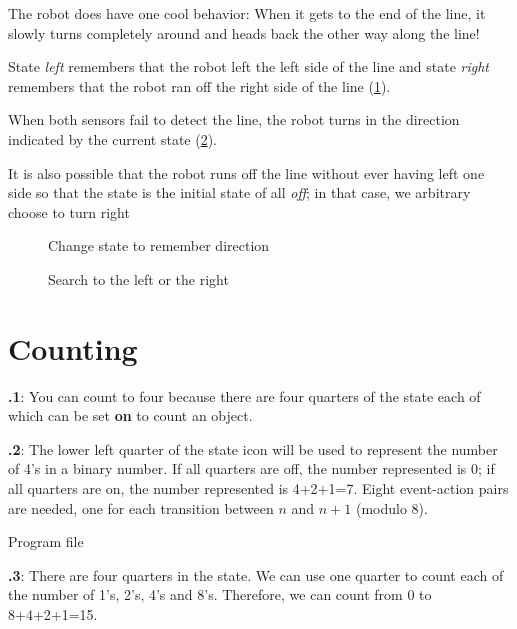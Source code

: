 \documentclass[12pt,a4paper,english]{article}
\begin{document}
The robot does have one cool behavior: When it gets to the end of the
line, it slowly turns completely around and heads back the other way
along the line!

State \emph{left}  remembers that the robot left the
left side of the line and state \emph{right} 
remembers that the robot ran off the right side of the line
(\cref{fig.follow3}).

When both sensors fail to detect the line, the robot turns in the
direction indicated by the current state (\cref{fig.follow1}).

It is also possible that the robot runs off the line without ever having
left one side so that the state is the initial state of all \emph{off};
in that case, we arbitrary choose to turn right 

\begin{figure}
\begin{center}
\caption{Change state to remember direction}\label{fig.follow3}
\end{center}
\end{figure}

\begin{figure}
\begin{center}
\caption{Search to the left or the right}\label{fig.follow1}
\end{center}
\end{figure}

\clearpage

\section{Counting}

\textbf{\thesection.1}:
You can count to four because there are four quarters of the state
each of which can be set \textbf{on} to count an object.

\textbf{\thesection.2}:
The lower left quarter of the state icon will be used to represent the
number of 4's in a binary number. If all quarters are off, the number represented
is 0; if all quarters are on, the number represented is 4+2+1=7.
Eight event-action pairs are needed, one for each transition between $n$ and
$n+1$ (modulo 8).

{\raggedleft \hfill Program file }


\textbf{\thesection.3}:
There are four quarters in the state. We can use one quarter to count
each of the number of 1's, 2's, 4's and 8's. Therefore, we can count
from 0 to 8+4+2+1=15.
\end{document}
